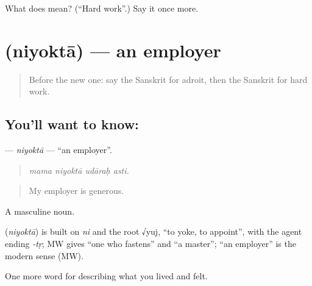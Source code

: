 \begin{tcolorbox}[breakable,colback=teal!4,colframe=teal!35!black,title={Before you move on}]
What does  mean? (\textquotedblleft{}Hard work\textquotedblright{}.) Say it once more.
\end{tcolorbox}
\section[\texorpdfstring{\sk{नियोक्ता} (niyoktā)}{नियोक्ता (niyoktā)}]{ (niyoktā) — an employer}

\label{lesson:SA-C503-niyokta}



\begin{quote}
Before the new one: say the Sanskrit for adroit, then the Sanskrit for hard work.
\end{quote}

\subsection*{You'll want to know: }
\textbf{} — \emph{niyoktā} — \textquotedblleft{}an employer\textquotedblright{}.

\begin{quote}
   
\end{quote}

\begin{quote}
\emph{mama niyoktā udāraḥ asti.}
\end{quote}

\begin{quote}
My employer is generous.
\end{quote}

A masculine noun.

\begin{cousinweb}
\textbf{} (\emph{niyoktā}) is built on \emph{ni} and the root √yuj, \textquotedblleft{}to yoke, to appoint\textquotedblright{}, with the agent ending \emph{-tṛ}; MW gives \textquotedblleft{}one who fastens\textquotedblright{} and \textquotedblleft{}a master\textquotedblright{}; \textquotedblleft{}an employer\textquotedblright{} is the modern sense (MW).
\end{cousinweb}

\begin{grammarlens}[title={What you've built}]
One more word for describing what you lived and felt.
\end{grammarlens}

